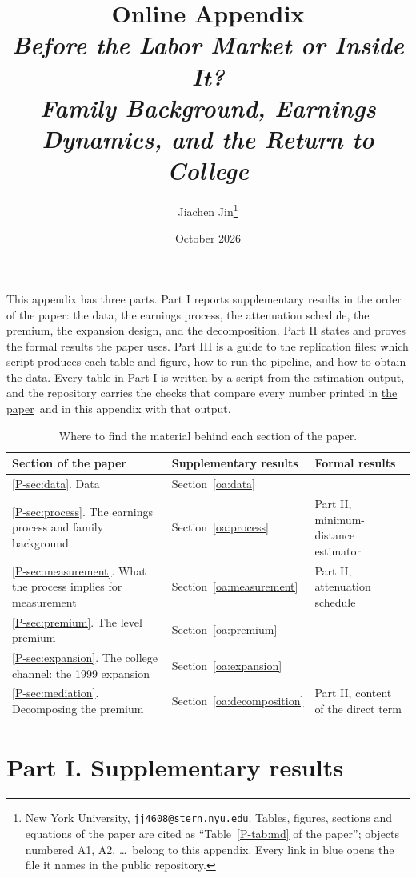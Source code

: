 \documentclass[11pt]{article}
\title{Online Appendix\\[6pt]
{\large\emph{Before the Labor Market or Inside It?\\[-6pt] Family Background, Earnings Dynamics, and the Return to College}}}
\author{Jiachen Jin\thanks{New York University,
\texttt{jj4608@stern.nyu.edu}. Tables, figures, sections and equations
of the paper are cited as ``Table~\ref{P-tab:md} of the paper''; objects
numbered A1, A2, \ldots\ belong to this appendix. Every link in blue
opens the file it names in the public repository.}}
\date{October 2026}
\numberwithin{equation}{section}
\newcommand{\repourl}{https://github.com/JiachenJin1001/family-background-earnings-china}
\newcommand{\paperpdf}{\href{\repourl/blob/main/unified/paper/main.pdf}{the paper}}
\begin{document}
\maketitle
\thispagestyle{empty}

\noindent This appendix has three parts. Part I reports supplementary
results in the order of the paper: the data, the earnings process, the
attenuation schedule, the premium, the expansion design, and the
decomposition. Part II states and proves the formal results the paper
uses. Part III is a guide to the replication files: which script
produces each table and figure, how to run the pipeline, and how to
obtain the data. Every table in Part I is written by a script from the estimation output, and the repository carries the
checks that compare every number printed in \paperpdf\ and in this appendix with that output.

\begin{table}[H]
\centering
\small
\caption{Where to find the material behind each section of the paper.}
\label{oatab:map}
\begin{tabular}{@{}L{5.4cm}L{5.6cm}L{4.0cm}@{}}
\toprule
Section of the paper & Supplementary results & Formal results \\
\midrule
\ref{P-sec:data}. Data & Section~\ref{oa:data} & \\
\ref{P-sec:process}. The earnings process and family background &
Section~\ref{oa:process} & Part II, minimum-distance estimator \\
\ref{P-sec:measurement}. What the process implies for measurement &
Section~\ref{oa:measurement} & Part II, attenuation schedule \\
\ref{P-sec:premium}. The level premium & Section~\ref{oa:premium} & \\
\ref{P-sec:expansion}. The college channel: the 1999 expansion &
Section~\ref{oa:expansion} & \\
\ref{P-sec:mediation}. Decomposing the premium &
Section~\ref{oa:decomposition} & Part II, content of the direct term \\
\bottomrule
\end{tabular}
\end{table}

\clearpage
\tableofcontents
\newpage

\part*{Part I. Supplementary results}
\end{document}
